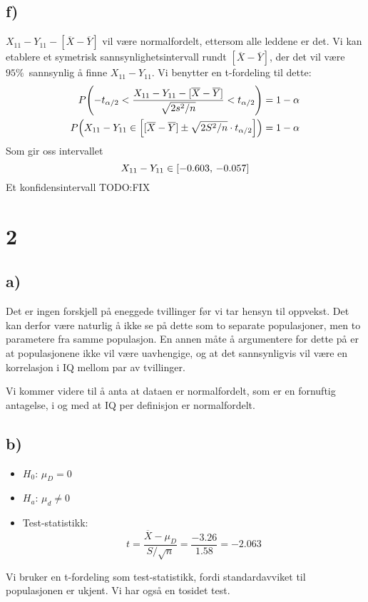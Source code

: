 \documentclass[12p,a4paper]{article}
\renewcommand{\bar}{\overline}
\begin{document}
\subsection*{f)}
$X_{11} - Y_{11} - [\bar{X} - \bar{Y}]$ vil være normalfordelt, ettersom alle leddene er det. Vi kan etablere et symetrisk sannsynlighetsintervall rundt $[\bar{X} - \bar{Y}]$, der det vil være $95\%$ sannsynlig å finne $X_{11} - Y_{11}$. Vi benytter en t-fordeling til dette:
\begin{align*}
    P\qty(-t_{\alpha/2} < \frac{X_{11} - Y_{11} - [\bar{X} - \bar{Y}]}{\sqrt{2s^2/n}} < t_{\alpha/2}) &= 1-\alpha \\
    P\qty(X_{11} - Y_{11} \in \qty[[\bar{X} - \bar{Y}] \pm \sqrt{2S^2/n}\cdot t_{\alpha/2}] ) &= 1 - \alpha
\end{align*}
Som gir oss intervallet
\[
    X_{11} - Y_{11} \in \qty[-0.603,\, -0.057]
\]
Et konfidensintervall TODO:FIX



\section*{2}
\subsection*{a)}
Det er ingen forskjell på eneggede tvillinger før vi tar hensyn til oppvekst. Det kan derfor være naturlig å ikke se på dette som to separate populasjoner, men to parametere fra samme populasjon. En annen måte å argumentere for dette på er at populasjonene ikke vil være uavhengige, og at det sannsynligvis vil være en korrelasjon i IQ mellom par av tvillinger.

Vi kommer videre til å anta at dataen er normalfordelt, som er en fornuftig antagelse, i og med at IQ per definisjon er normalfordelt.



\subsection*{b)}
\begin{itemize}
    \item $H_0:\, \mu_D = 0$
    \item $H_a:\, \mu_d \neq 0$
    \item Test-statistikk:
    \[
        t = \frac{\bar{X} - \mu_D}{S/\sqrt{n}} = \frac{-3.26}{1.58} = -2.063
    \]
\end{itemize}
Vi bruker en t-fordeling som test-statistikk, fordi standardavviket til populasjonen er ukjent. Vi har også en tosidet test.
\end{document}
